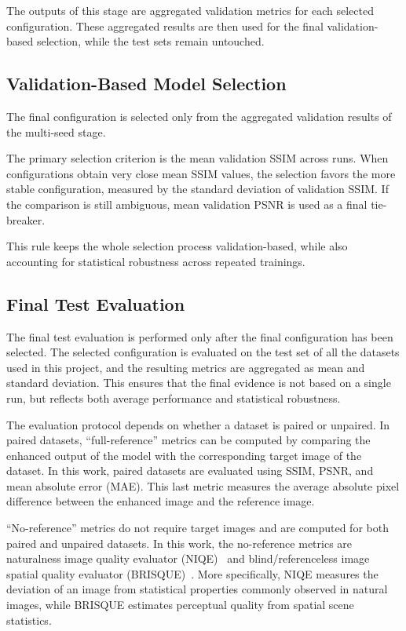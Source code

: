 The outputs of this stage are aggregated validation metrics for each selected configuration. These aggregated results are then used for the final validation-based selection, while the test sets remain untouched.

\subsection{Validation-Based Model Selection}

The final configuration is selected only from the aggregated validation results of the multi-seed stage.

The primary selection criterion is the mean validation SSIM across runs. When configurations obtain very close mean SSIM values, the selection favors the more stable configuration, measured by the standard deviation of validation SSIM. If the comparison is still ambiguous, mean validation PSNR is used as a final tie-breaker.

This rule keeps the whole selection process validation-based, while also accounting for statistical robustness across repeated trainings.

\subsection{Final Test Evaluation}

The final test evaluation is performed only after the final configuration has been selected. The selected configuration is evaluated on the test set of all the datasets used in this project, and the resulting metrics are aggregated as mean and standard deviation. This ensures that the final evidence is not based on a single run, but reflects both average performance and statistical robustness.

The evaluation protocol depends on whether a dataset is paired or unpaired. In paired datasets, ``full-reference'' metrics can be computed by comparing the enhanced output of the model with the corresponding target image of the dataset. In this work, paired datasets are evaluated using SSIM, PSNR, and mean absolute error (MAE). This last metric measures the average absolute pixel difference between the enhanced image and the reference image.

``No-reference'' metrics do not require target images and are computed for both paired and unpaired datasets. In this work, the no-reference metrics are naturalness image quality evaluator (NIQE)~\cite{DBLP:journals/spl/MittalSB13} and blind/referenceless image spatial quality evaluator (BRISQUE)~\cite{DBLP:journals/tip/MittalMB12}. More specifically, NIQE measures the deviation of an image from statistical properties commonly observed in natural images, while BRISQUE estimates perceptual quality from spatial scene statistics.

